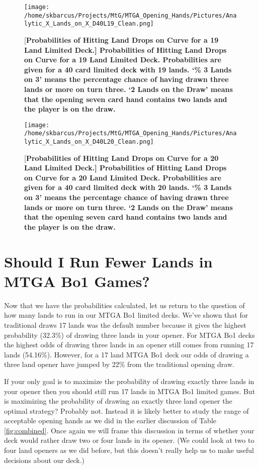 \documentclass[oneside]{book}   %
\begin{document}
	\begin{figure}[!ht]
	\centering
	\centerline{\texttt{[image: /home/skbarcus/Projects/MtG/MTGA\_Opening\_Hands/Pictures/Analytic\_X\_Lands\_on\_X\_D40L19\_Clean.png]}}
	[\bf{Probabilities of Hitting Land Drops on Curve for a 19 Land Limited Deck.}]{
	{\bf{Probabilities of Hitting Land Drops on Curve for a 19 Land Limited Deck.}} Probabilities are given for a 40 card limited deck with 19 lands. `\% 3 Lands on 3' means the percentage chance of having drawn three lands or more on turn three. `2 Lands on the Draw' means that the opening seven card hand contains two lands and the player is on the draw.}
	\label{fig:19_curve}
	\end{figure}	
	
	\begin{figure}[!ht]
	\centering
	\centerline{\texttt{[image: /home/skbarcus/Projects/MtG/MTGA\_Opening\_Hands/Pictures/Analytic\_X\_Lands\_on\_X\_D40L20\_Clean.png]}}
	[\bf{Probabilities of Hitting Land Drops on Curve for a 20 Land Limited Deck.}]{
	{\bf{Probabilities of Hitting Land Drops on Curve for a 20 Land Limited Deck.}} Probabilities are given for a 40 card limited deck with 20 lands. `\% 3 Lands on 3' means the percentage chance of having drawn three lands or more on turn three. `2 Lands on the Draw' means that the opening seven card hand contains two lands and the player is on the draw.}
	\label{fig:20_curve}
	\end{figure}	
	
\section{Should I Run Fewer Lands in MTGA Bo1 Games?}

Now that we have the probabilities calculated, let us return to the question of how many lands to run in our MTGA Bo1 limited decks. We've shown that for traditional draws 17 lands was the default number because it gives the highest probability (32.3\%) of drawing three lands in your opener. For MTGA Bo1 decks the highest odds of drawing three lands in an opener still comes from running 17 lands (54.16\%). However, for a 17 land MTGA Bo1 deck our odds of drawing a three land opener have jumped by 22\% from the traditional opening draw. 

If your only goal is to maximize the probability of drawing exactly three lands in your opener then you should still run 17 lands in MTGA Bo1 limited games. But is maximizing the probability of drawing an exactly three land opener the optimal strategy? Probably not. Instead it is likely better to study the range of acceptable opening hands as we did in the earlier discussion of Table \ref{fig:combined}. Once again we will frame this discussion in terms of whether your deck would rather draw two or four lands in its opener. (We could look at two to four land openers as we did before, but this doesn't really help us to make useful decisions about our deck.) 
\end{document}
